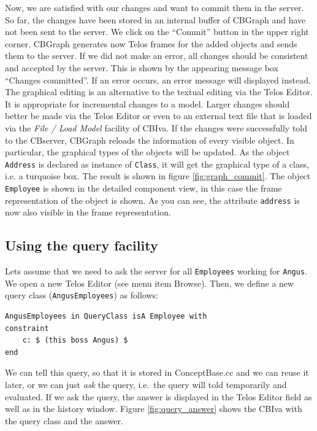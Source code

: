 Now, we are satisfied with our changes and want to commit them in the server. So far, the
changes have been stored in an internal buffer of CBGraph and have not been
sent to the server. We click on the ``Commit'' button in the upper right corner.
CBGraph generates now Telos frames for the added objects and sends them
to the server. If we did not make an error, all changes should be consistent
and accepted by the server. This is shown by the appearing message box ``Changes committed''.
If an error occurs, an error message will displayed instead. The graphical editing is
an alternative to the textual editing via the Telos Editor. It is appropriate for incremental
changes to a model. Larger changes should better be made via the Telos Editor or
even to an external text file that is loaded via the {\em File / Load Model\/} facility
of CBIva.
If the changes were successfully told to the CBserver, CBGraph
reloads the information of every visible object. In particular, the graphical
types of the objects will be updated. As the object {\tt Address} is declared
as instance of {\tt Class}, it will get the graphical type of a class, i.e.
a turquoise box. The result is shown in figure \ref{fig:graph_commit}. The object
{\tt Employee} is shown in the detailed component view, in this case the
frame representation of the object is shown. As you can see, the attribute
{\tt address} is now also visible in the frame representation.



\subsection{Using the query facility}


Lets assume that we need to ask the server for all {\tt Employees} working for {\tt Angus}. 
We open a new Telos Editor (see menu item Browse).
Then, we define a new query class ({\tt AngusEmployees}) as follows:

\begin{verbatim}
AngusEmployees in QueryClass isA Employee with
constraint
    c: $ (this boss Angus) $
end
\end{verbatim}

We can tell this query, so that it is stored in ConceptBase.cc and we can reuse it later,
or we can just {\em ask} the query, i.e.\ the query will told temporarily and evaluated.
If we ask the query, the answer is displayed in the Telos Editor field as well as in
the history window. Figure \ref{fig:query_answer} shows the
CBIva with the query class and the answer.

